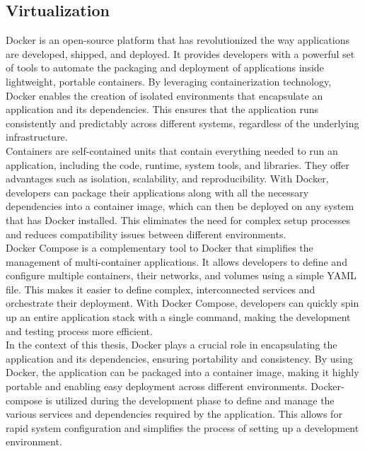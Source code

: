 \documentclass[../Main.tex]{subfiles}
\begin{document}
\subsection{Virtualization}
Docker is an open-source platform that has revolutionized the way applications are developed, shipped, and deployed. It provides developers with a powerful set of tools to automate the packaging and deployment of applications inside lightweight, portable containers. By leveraging containerization technology, Docker enables the creation of isolated environments that encapsulate an application and its dependencies. This ensures that the application runs consistently and predictably across different systems, regardless of the underlying infrastructure.\\
\indent Containers are self-contained units that contain everything needed to run an application, including the code, runtime, system tools, and libraries. They offer advantages such as isolation, scalability, and reproducibility. With Docker, developers can package their applications along with all the necessary dependencies into a container image, which can then be deployed on any system that has Docker installed. This eliminates the need for complex setup processes and reduces compatibility issues between different environments.\\
\indent Docker Compose is a complementary tool to Docker that simplifies the management of multi-container applications. It allows developers to define and configure multiple containers, their networks, and volumes using a simple YAML file. This makes it easier to define complex, interconnected services and orchestrate their deployment. With Docker Compose, developers can quickly spin up an entire application stack with a single command, making the development and testing process more efficient.\\
\indent In the context of this thesis, Docker plays a crucial role in encapsulating the application and its dependencies, ensuring portability and consistency. By using Docker, the application can be packaged into a container image, making it highly portable and enabling easy deployment across different environments. Docker-compose is utilized during the development phase to define and manage the various services and dependencies required by the application. This allows for rapid system configuration and simplifies the process of setting up a development environment.
\end{document}
